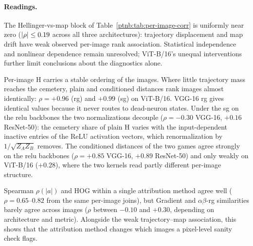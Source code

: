 \begin{table}[H]
\TableContent{
    \centering
    \scriptsize
    \setlength{\tabcolsep}{3.5pt}
    
    }%
\caption[Per-image Spearman rank correlations]{Per-image Spearman rank correlations across the $\perImageN$-image ImageNet-S test split
    at the selected cascading steps of the Hellinger and attribution-sanity pipelines. The randomized
    layers match on the CNNs; the ViT-B/16 attribution cascade additionally randomizes $Q$, $K$, and $V$.  Left block:
    within-Hellinger cross-correlations of the plain ($\mathrm{H}_{\cdot,\mathrm{pl}}$) and
    survival-conditioned ($\mathrm{H}_{\cdot,\mathrm{surv}}$) distances under the \ac{rg} and \ac{sg}
    kernels (self-entries shown as $-$; trivially $+1$).  Right block: Hellinger-vs-map
    cross-correlations.}
    \label{ptnb:tab:per-image-corr}
\end{table}

\paragraph{Readings.}
The Hellinger-vs-map block of Table~\ref{ptnb:tab:per-image-corr} is uniformly near zero ($|\rho| \leq 0.19$ across all three architectures): trajectory displacement and map drift have weak observed per-image rank association. Statistical independence and nonlinear dependence remain unresolved; ViT-B/16's unequal interventions further limit conclusions about the diagnostics alone.

Per-image $\mathrm{H}$ carries a stable ordering of the images. Where little trajectory mass reaches the cemetery, plain and conditioned distances rank images almost identically: $\rho = +0.96$ (\ac{rg}) and $+0.99$ (\ac{sg}) on ViT-B/16. VGG-16 \ac{rg} gives identical values because it never routes to dead-neuron states. Under the \ac{sg} on the \ac{relu} backbones the two normalizations decouple ($\rho = -0.30$ VGG-16, $+0.16$ ResNet-50): the cemetery share of plain $\mathrm{H}$ varies with the input-dependent inactive entries of the ReLU activation vectors, which renormalization by $1/\sqrt{Z_A Z_B}$ removes. The conditioned distances of the two games agree strongly on the \ac{relu} backbones ($\rho = +0.85$ VGG-16, $+0.89$ ResNet-50) and only weakly on ViT-B/16 ($+0.28$), where the two kernels read partly different per-image structure.

Spearman $\rho(|a|)$ and HOG within a single attribution method agree well ($\rho=0.65$--$0.82$ from the same per-image joins), but Gradient and $\alpha\beta$-\ac{rg} similarities barely agree across images ($\rho$ between $-0.10$ and $+0.30$, depending on architecture and metric). Alongside the weak trajectory--map association, this shows that the attribution method changes which images a pixel-level sanity check flags.
\par\medskip
\providecommand{\nValGrid}{\textcolor{red}{??}}%

